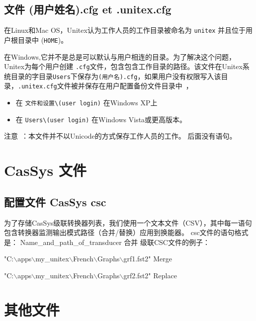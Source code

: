 \subsection{文件 (用户姓名).cfg et .unitex.cfg}
在Linux和Mac OS，Unitex认为工作人员的工作目录被命名为 \verb+unitex+ 并且位于用户根目录中 (\verb+HOME+)。

\bigskip
在Windows,它并不是总是可以默认与用户相连的目录。为了解决这个问题，Unitex为每个用户创建 \verb+.cfg+文件，包含包含工作目录的路径。该文件在Unitex系统目录的字目录\verb+Users+下保存为\verb+(用户名).cfg+，如果用户没有权限写入该目录，\verb+.unitex.cfg+文件被并保存在用户配置备份文件目录中~，

\begin{itemize}
\item 在 \verb+文件和设置\(user login)+ 在Windows XP上
\item 在 \verb+Users\(user login)+ 在Windows Vista或更高版本。
\end{itemize}

\bigskip
\noindent
注意~：本文件并不以Unicode的方式保存工作人员的工作。
后面没有语句。

\section{ CasSys 文件}

\subsection{配置文件 CasSys csc}
为了存储CasSys级联转换器列表，我们使用一个文本文件（CSV），其中每一语句包含转换器监测输出模式路径（合并/替换）应用到换能器。
csc文件的语句格式是： Name\_and\_path\_of\_transducer 合并
级联CSC文件的例子：


\ttfamily
"C:$\backslash$apps$\backslash$my\_unitex$\backslash$French$\backslash$Graphs$\backslash$grf1.fst2" Merge

"C:$\backslash$apps$\backslash$my\_unitex$\backslash$French$\backslash$Graphs$\backslash$grf2.fst2" Replace
\rmfamily

\section{其他文件}

